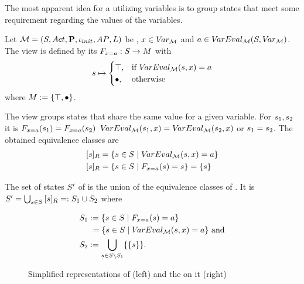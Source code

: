 \documentclass[preview]{standalone}
\begin{document}
The most apparent idea for a \viewN utilizing variables is to group states that meet some requirement regarding the values of the variables.



\begin{definition}
	Let ${{{\mathcal{M}}}} = {{({S}, {Act}, {\textbf{P}}, {\iota_{init}}, {AP}, {L})}}$ be \achgphN, ${x} \in {V\!ar_{\ensuremath{{{\mathcal{M}}}}}}$ and $\varval \in \varevalimg$. The view \viewparamvalueseq is defined by its \grpfctN ${{F_{{x} = {a}}}} : {S} \to {\ensuremath{{M}}}$ with
	\[
	{s} \mapsto
	\begin{cases}
			{\top}, &\text{if } {V\!arEval_{\ensuremath{{{\mathcal{M}}}}}}({s}, {x}) = {a}\\
			{\bullet}, &\text{otherwise}
		\end{cases}
	\]
	where ${{M}} := {\{{\top}, {\bullet}\}}$.
\end{definition}

The view \viewparamvalueseq groups states that share the same value for a given variable. For ${s}_1, {s}_2$ it is ${{F_{{x} = {a}}}}({s}_1) = {{F_{{x} = {a}}}}({s}_2)$ \iffN ${V\!arEval_{{{\mathcal{M}}}}}({s}_1, {x}) = {V\!arEval_{{{\mathcal{M}}}}}({s}_2, {x})$ or ${s}_1 = {s}_2$. The obtained equivalence classes are
\begin{align*}
	{\ensuremath{{[{s}]_{{R}}}}} &= \{{s} \in {S} \mid {V\!arEval_{\ensuremath{{{\mathcal{M}}}}}}({s}, {x}) = {a}\} \\
	{{[{s}]_{{R}}}} &= \{{s} \in {S} \mid {\ensuremath{{F_{{x} = {a}}}}}({s}) = {s}\} = \{{s}\}
\end{align*}

The set of states ${S}'$ of \viewparamvalueseq is the union of the equivalence classes of \eqrelview. It is ${S}' = \bigcup_{{s} \in {S}} {{[{s}]_{{R}}}} =: {S}_1 \cup {S}_2$ where

\begin{align*}
	{S}_1 &:= \{{s} \in {S} \mid {\ensuremath{{F_{{x} = {a}}}}}({s}) = {a}\} \\
	&\hspace{1.15mm}= \{{s} \in {S}  \mid {V\!arEval_{\ensuremath{{{\mathcal{M}}}}}}({s}, {x}) = {a}\} \text{ and} \\
	{S}_2 &:= {\bigcup_{{s} \in {S} \setminus {S}_1}\{\{{s}\}\}}.
\end{align*}

\begin{figure}[h]
	\begin{minipage}{.6\textwidth}
		
	\end{minipage}%
	\begin{minipage}{.5\textwidth}
		
	\end{minipage}
	\caption{Simplified representations of \mdp (left) and the \viewN \viewdistance on it (right)}
	\label{fig:varsValEq}  
\end{figure}
\end{document}
